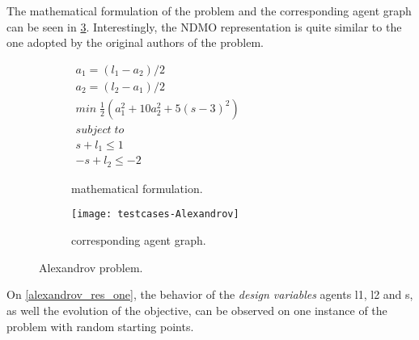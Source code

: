 The mathematical formulation of the problem and the corresponding agent graph can be seen in \figurename{} \ref{alexandrov}. Interestingly, the NDMO representation is quite similar to the one adopted by the original authors of the problem.

\begin{figure}
\centering
	\begin{subfigure}[b]{0.4\textwidth}
		$\begin{array}{c}
			a_1 = (l_1 - a_2)/2 \\
			a_2 = (l_2 - a_1)/2 \\
			min \; \frac{1}{2}(a_1^2 + 10a_2^2 + 5(s-3)^2) \\
			subject \; to \\
			s + l_1 \leq 1 \\
			-s + l_2 \leq -2
		\end{array}$
		\caption{mathematical formulation.}\label{alexandrov:math}
	\end{subfigure}
	\hfill%
	\begin{subfigure}[b]{0.59\textwidth}
		\texttt{[image: testcases-Alexandrov]}%
		\caption{corresponding agent graph.}\label{alexandrov:graph}
	\end{subfigure}
\caption{Alexandrov problem.}\label{alexandrov}
\end{figure}

On \figurename{} \ref{alexandrov_res_one}, the behavior of the \emph{design variables} agents l1, l2 and s, as well the evolution of the objective, can be observed on one instance of the problem with random starting points.

